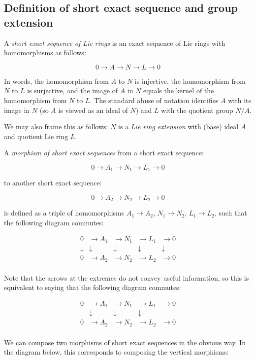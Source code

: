 \documentclass{ucetd}
\begin{document}
\subsection{Definition of short exact sequence and group extension}

A {\em short exact sequence of Lie rings} is an exact sequence of Lie
rings with homomorphisms as follows:

$$0 \to A \to N \to L \to 0$$

In words, the homomorphism from $A$ to $N$ is injective, the
homomorphism from $N$ to $L$ is surjective, and the image of $A$ in
$N$ equals the kernel of the homomorphism from $N$ to $L$. The
standard abuse of notation identifies $A$ with its image in $N$ (so
$A$ is viewed as an ideal of $N$) and $L$ with the quotient
group $N/A$.

We may also frame this as follows: $N$ is a {\em Lie ring extension}
with (base) ideal $A$ and quotient Lie ring $L$.

A {\em morphism of short exact sequences} from a short exact sequence:

$$0 \to A_1 \to N_1 \to L_1 \to 0$$

to another short exact sequence:

$$0 \to A_2 \to N_2 \to L_2 \to 0$$

is defined as a triple of homomorphisms $A_1 \to A_2$, $N_1 \to N_2$,
$L_1 \to L_2$, such that the following diagram commutes:

$$\begin{array}{rrrrr}
  0 & \to A_1 & \to N_1 & \to L_1 & \to 0 \\
  \downarrow & \downarrow & \downarrow & \downarrow & \downarrow\\
  0 & \to A_2 & \to N_2 & \to L_2 & \to 0 \\
\end{array}$$

Note that the arrows at the extremes do not convey useful information,
so this is equivalent to saying that the following diagram commutes:

$$\begin{array}{rrrrr}
  0 & \to A_1 & \to N_1 & \to L_1 & \to 0 \\
  & \downarrow & \downarrow & \downarrow &\\
  0 & \to A_2 & \to N_2 & \to L_2 & \to 0 \\
\end{array}$$

We can compose two morphisms of short exact sequences in the obvious
way. In the diagram below, this corresponds to composing the vertical
morphisms:
\end{document}

